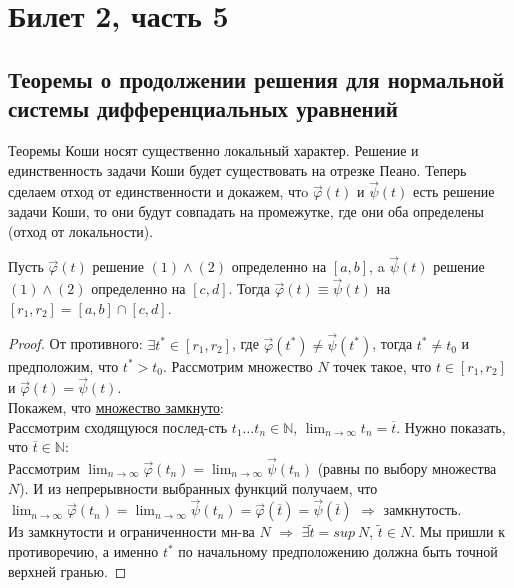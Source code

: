 



    \section*{Билет 2, часть 5}
    \subsection*{Теоремы о продолжении решения для нормальной системы дифференциальных уравнений}

    Теоремы Коши носят существенно локальный характер. Решение и единственность задачи Коши будет существовать на отрезке Пеано. Теперь сделаем отход от единственности и докажем, чтo $\Vec{\varphi}(t)$ и $\Vec{\psi}(t)$ есть решение задачи Коши, то они будут совпадать на промежутке, где они оба определены (отход от локальности).

	\begin{theorem}
		Пусть $\Vec{\varphi}(t)$ решение $(1) \wedge (2)$ определенно на $[a, b]$, a  $\Vec{\psi}(t)$ решение $(1) \wedge (2)$ определенно на $[c, d]$.
		Тогда $\Vec{\varphi}(t) \equiv \Vec{\psi}(t)$ на $[r_1, r_2] = [a, b] \cap [c, d]$.
	\end{theorem}
	\begin{proof}
        От противного: $\exists t^* \in [r_1, r_2]$, где $\Vec{\varphi}(t^*) \neq \Vec{\psi}(t^*)$, тогда $t^* \neq t_0$ и предположим, что $t^* > t_0$. 
        Рассмотрим множество $N$ точек такое, что $t \in [r_1, r_2]$ и $\Vec{\varphi}(t) = \Vec{\psi}(t)$. \\
        Покажем, что \underline{множество замкнуто}: \\
        Рассмотрим сходящуюся послед-сть $t_1 \ldots t_n \in \mathbb{N}$, $\displaystyle \lim_{n\to\infty} t_n = \overline{t}$. Нужно показать, что $\overline{t} \in \mathbb{N}$:\\
        Рассмотрим $\displaystyle \lim_{n\to\infty} \Vec{\varphi}(t_n) = \lim_{n\to\infty} \Vec{\psi}(t_n)$ (равны по выбору множества $N$). И из непрерывности выбранных функций получаем, что $\displaystyle \lim_{n\to\infty} \Vec{\varphi}(t_n) = \lim_{n\to\infty} \Vec{\psi}(t_n) = \Vec{\varphi}(\overline{t}) = \Vec{\psi}(\overline{t})$ $\Rightarrow$ замкнутость. \\
        Из замкнутости и ограниченности мн-ва $N$ $\Rightarrow$ $\exists \widetilde{t} = sup\ N$, $\widetilde{t} \in N$. Мы пришли к противоречию, а именно $t^*$ по начальному предположению должна быть точной верхней гранью.
    \end{proof}
    
